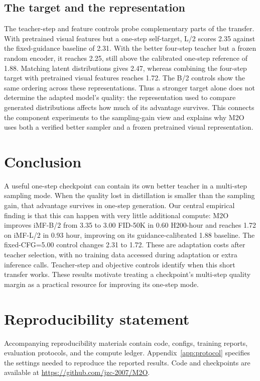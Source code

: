 \documentclass{article}
\begin{document}
\subsection{The target and the representation}
The teacher-step and feature controls probe complementary parts of the
transfer. With pretrained visual features but a one-step self-target, L/2
scores 2.35 against the fixed-guidance baseline of 2.31. With the better
four-step teacher but a frozen random encoder, it reaches 2.25, still
above the calibrated one-step reference of 1.88. Matching latent
distributions gives 2.47, whereas combining the four-step target with
pretrained visual features reaches 1.72. The B/2 controls show the same
ordering across these representations. Thus a stronger target alone does
not determine the adapted model's quality: the representation used to
compare generated distributions affects how much of its advantage survives.
This connects the component experiments to the sampling-gain view and
explains why M2O uses both a verified better sampler and a frozen
pretrained visual representation.

\section{Conclusion}
A useful one-step checkpoint can contain its own better teacher in a
multi-step sampling mode. When the quality lost in distillation is smaller
than the sampling gain, that advantage survives in one-step generation.
Our central empirical finding is that this can happen with very little
additional compute: M2O improves iMF-B/2 from 3.35 to 3.00 FID-50K in
0.60 H200-hour and reaches 1.72 on iMF-L/2 in 0.93 hour, improving on
its guidance-calibrated 1.88 baseline. The fixed-CFG=5.00 control changes
2.31 to 1.72. These are adaptation costs after teacher selection, with
no training data accessed during adaptation or extra inference calls.
Teacher-step and objective controls identify when this short transfer
works. These results motivate treating a checkpoint's multi-step quality
margin as a practical resource for improving its one-step mode.
\label{sec:main-end}

\section*{Reproducibility statement}
Accompanying reproducibility materials contain code, configs, training reports,
evaluation protocols, and the compute ledger. Appendix~\ref{app:protocol}
specifies the settings needed to reproduce the reported results.
Code and checkpoints are available at \url{https://github.com/jzc-2007/M2O}.
\end{document}
